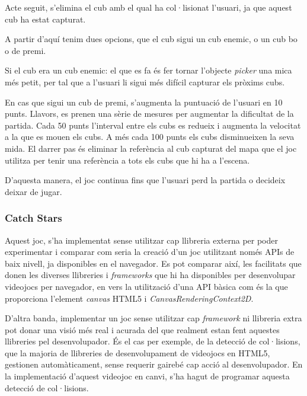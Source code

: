 \documentclass[12pt,a4paper,catalan]{article}
\begin{document}
	Acte seguit, s'elimina el cub amb el qual ha col·lisionat l'usuari, ja que aquest cub ha estat capturat.
	
	A partir d'aquí tenim dues opcions, que el cub sigui un cub enemic, o un cub bo o de premi.
	
	Si el cub era un cub enemic: el que es fa és fer tornar l'objecte \textit{picker} una mica més petit, per tal que a l'usuari li sigui més difícil capturar els pròxims cubs.
	
	En cas que sigui un cub de premi, s'augmenta la puntuació de l'usuari en 10 punts. Llavors, es prenen una sèrie de mesures per augmentar la dificultat de la partida. Cada 50 punts l'interval entre els cubs es redueix i augmenta la velocitat a la que es mouen els cubs. A més cada 100 punts els cubs disminueixen la seva mida.
	El darrer pas és eliminar la referència al cub capturat del mapa que el joc utilitza per tenir una referència a tots els cubs que hi ha a l'escena.
	
	D'aquesta manera, el joc continua fins que l'usuari perd la partida o decideix deixar de jugar.
	
	\subsubsection{Catch Stars}
	Aquest joc, s'ha implementat sense utilitzar cap llibreria externa per poder experimentar i comparar com seria la creació d'un joc utilitzant només APIs de baix nivell, ja disponibles en el navegador. Es pot comparar així, les facilitats que donen les diverses llibreries i \textit{frameworks} que hi ha disponibles per desenvolupar videojocs per navegador, en vers la utilització d'una API bàsica com és la que proporciona l'element \textit{canvas} HTML5 i \textit{CanvasRenderingContext2D}.
	
	D'altra banda, implementar un joc sense utilitzar cap \textit{framework} ni llibreria extra pot donar una visió més real i acurada del que realment estan fent aquestes llibreries pel desenvolupador. És el cas per exemple, de la detecció de col·lisions, que la majoria de llibreries de desenvolupament de videojocs en HTML5, gestionen automàticament, sense requerir gairebé cap acció al desenvolupador. En la implementació d'aquest videojoc en canvi, s'ha hagut de programar aquesta detecció de col·lisions.
	
\end{document}
